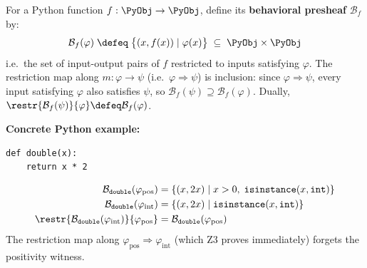 \begin{example}
\label{ex:behavioral-presheaf}
For a Python function $f : \PyObj \to \PyObj$, define its
\textbf{behavioral presheaf} $\mathcal{B}_f$ by:
\[
  \mathcal{B}_f(\varphi) \;\defeq\;
  \bigl\{(x, f(x)) \mid \varphi(x)\bigr\}
  \;\subseteq\; \PyObj \times \PyObj
\]
i.e.\ the set of input-output pairs of $f$ restricted to inputs satisfying
$\varphi$.  The restriction map along $m : \varphi \to \psi$ (i.e.\
$\varphi \Rightarrow \psi$) is inclusion: since $\varphi \Rightarrow \psi$,
every input satisfying $\varphi$ also satisfies $\psi$, so
$\mathcal{B}_f(\psi) \supseteq \mathcal{B}_f(\varphi)$.  Dually,
$\restr{\mathcal{B}_f(\psi)}{\varphi} \defeq \mathcal{B}_f(\varphi)$.

\medskip\noindent\textbf{Concrete Python example:}
\begin{lstlisting}
def double(x):
    return x * 2
\end{lstlisting}
\begin{align*}
\mathcal{B}_{\mathtt{double}}(\varphi_{\mathrm{pos}}) &=
  \{(x, 2x) \mid x > 0,\; \mathtt{isinstance}(x,\mathtt{int})\} \\
\mathcal{B}_{\mathtt{double}}(\varphi_{\mathrm{int}}) &=
  \{(x, 2x) \mid \mathtt{isinstance}(x,\mathtt{int})\} \\
\restr{\mathcal{B}_{\mathtt{double}}(\varphi_{\mathrm{int}})}
  {\varphi_{\mathrm{pos}}} &=
  \mathcal{B}_{\mathtt{double}}(\varphi_{\mathrm{pos}})
\end{align*}
The restriction map along $\varphi_{\mathrm{pos}} \Rightarrow
\varphi_{\mathrm{int}}$ (which Z3 proves immediately) forgets the positivity
witness.
\end{example}

